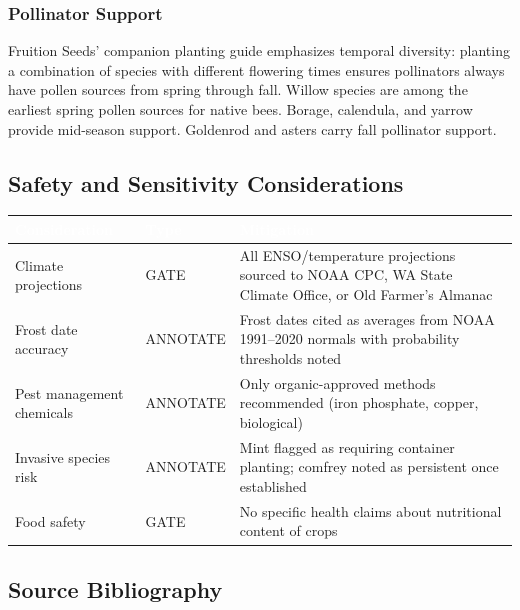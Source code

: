 \documentclass[11pt,letterpaper]{article}
\newcommand{\tableheader}[1]{\textbf{\sffamily\textcolor{white}{#1}}}
\begin{document}
\subsubsection{Pollinator Support}

Fruition Seeds' companion planting guide emphasizes temporal diversity: planting a combination of species with different flowering times ensures pollinators always have pollen sources from spring through fall. Willow species are among the earliest spring pollen sources for native bees. Borage, calendula, and yarrow provide mid-season support. Goldenrod and asters carry fall pollinator support.

\subsection{Safety and Sensitivity Considerations}

\begin{center}
\begin{tabularx}{\textwidth}{L{3cm}L{2cm}X}
\toprule
{}
\tableheader{Consideration} & \tableheader{Type} & \tableheader{Mitigation} \\
\midrule
Climate projections & GATE & All ENSO/temperature projections sourced to NOAA CPC, WA State Climate Office, or Old Farmer's Almanac \\
Frost date accuracy & ANNOTATE & Frost dates cited as averages from NOAA 1991--2020 normals with probability thresholds noted \\
Pest management chemicals & ANNOTATE & Only organic-approved methods recommended (iron phosphate, copper, biological) \\
Invasive species risk & ANNOTATE & Mint flagged as requiring container planting; comfrey noted as persistent once established \\
Food safety & GATE & No specific health claims about nutritional content of crops \\
\bottomrule
\end{tabularx}
\end{center}

\subsection{Source Bibliography}
\end{document}
